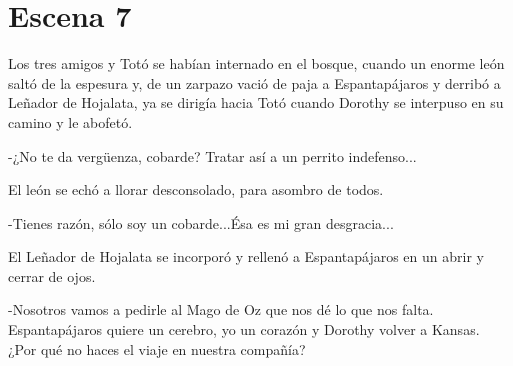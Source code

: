 \chapter{Escena 7}
Los tres amigos y Totó se habían internado en el  bosque, cuando un enorme león saltó de la espesura y, de un zarpazo vació de paja a Espantapájaros y derribó a Leñador de Hojalata, ya se dirigía hacia Totó cuando Dorothy se interpuso en su camino y le abofetó.

-¿No te da vergüenza, cobarde? Tratar así a un perrito indefenso...

El león se echó a llorar desconsolado, para asombro de todos.

-Tienes razón, sólo soy un cobarde...Ésa es mi gran desgracia...

El Leñador de Hojalata se incorporó y rellenó a Espantapájaros en un abrir y cerrar de ojos.

-Nosotros vamos a pedirle al Mago de Oz que nos dé lo que nos falta. Espantapájaros quiere un cerebro, yo un corazón y Dorothy volver a Kansas. ¿Por qué no haces el viaje en nuestra compañía?
